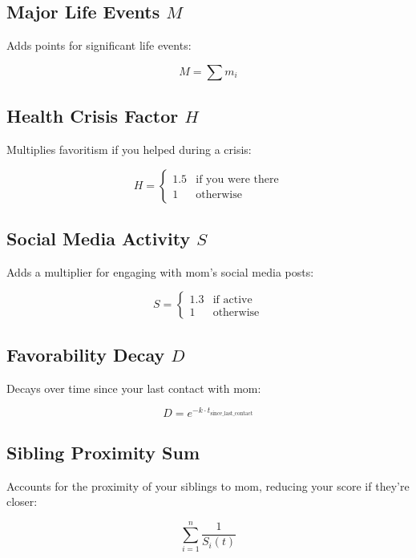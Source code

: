 \documentclass[12pt]{article}
\begin{document}
\subsection{Major Life Events \( M \)}
Adds points for significant life events:

\begin{equation}
M = \sum m_i
\end{equation}

\subsection{Health Crisis Factor \( H \)}
Multiplies favoritism if you helped during a crisis:

\begin{equation}
H = \begin{cases}
1.5 & \text{if you were there} \\
1 & \text{otherwise}
\end{cases}
\end{equation}

\subsection{Social Media Activity \( S \)}
Adds a multiplier for engaging with mom’s social media posts:

\begin{equation}
S = \begin{cases}
1.3 & \text{if active} \\
1 & \text{otherwise}
\end{cases}
\end{equation}

\subsection{Favorability Decay \( D \)}
Decays over time since your last contact with mom:

\begin{equation}
D = e^{-k \cdot t_{\text{since\_last\_contact}}}
\end{equation}

\subsection{Sibling Proximity Sum}
Accounts for the proximity of your siblings to mom, reducing your score if they’re closer:

\begin{equation}
\sum_{i=1}^{n} \frac{1}{S_i(t)}
\end{equation}
\end{document}

